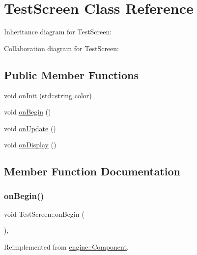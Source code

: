 \hypertarget{class_test_screen}{}\section{Test\+Screen Class Reference}
\label{class_test_screen}


Inheritance diagram for Test\+Screen\+:


Collaboration diagram for Test\+Screen\+:
\subsection*{Public Member Functions}
\begin{DoxyCompactItemize}
\item 
void \mbox{\hyperlink{class_test_screen_ae625f31a4606b32dca57b0049ab482c0}{on\+Init}} (std\+::string color)
\item 
void \mbox{\hyperlink{class_test_screen_a4a1ec22e2510e846790c4ad6a33906ad}{on\+Begin}} ()
\item 
void \mbox{\hyperlink{class_test_screen_a991300ebe46989b859a2c68a15e9cad4}{on\+Update}} ()
\item 
void \mbox{\hyperlink{class_test_screen_a3ea48247e6a1db6d6f2e703b5d433f35}{on\+Display}} ()
\end{DoxyCompactItemize}


\subsection{Member Function Documentation}
\mbox{\label{class_test_screen_a4a1ec22e2510e846790c4ad6a33906ad}} 
\subsubsection{\texorpdfstring{on\+Begin()}{onBegin()}}
{\footnotesize\ttfamily void Test\+Screen\+::on\+Begin (\begin{DoxyParamCaption}{ }\end{DoxyParamCaption})\hspace{0.3cm}{\ttfamily [inline]}, {\ttfamily [virtual]}}



Reimplemented from \mbox{\hyperlink{classengine_1_1_component_ad92b830daf72bca1d94f541d47477d74}{engine\+::\+Component}}.

